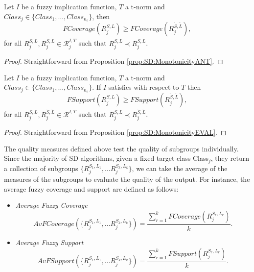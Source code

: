 \begin{proposition}\label{prop:SD:MonotonicityFCOV} 
	Let $I$ be a fuzzy implication function, $T$ a t-norm and $Class_j \in \{Class_1,\dots,Class_{n_c}\}$, then
	$$
	FCoverage(R^{S,L}_j) \geq FCoverage(R^{\tilde{S},\tilde{L}}_{j}),
	$$
	for all $R^{S,L}_j,R^{\tilde{S},\tilde{L}}_{j}  \in \mathcal{R}^{I,T}_j$ such that $R^{S,L}_j \prec R^{\tilde{S},\tilde{L}}_{j}$.
\end{proposition}

\begin{proof}
	Straightforward from Proposition \ref{prop:SD:MonotonicityANT}.
\end{proof}

\begin{proposition}\label{prop:MonotonicitySD}
	Let $I$ be a fuzzy implication function, $T$ a t-norm and $Class_j \in \{Class_1,\dots,Class_{n_c}\}$. If $I$ satisfies \MTC with respect to $T$ then
	$$FSupport(R^{S,L}_j) \geq FSupport(R^{\tilde{S},\tilde{L}}_{j}),$$
	 for all $R^{S,L}_j,R^{\tilde{S},\tilde{L}}_{j}  \in \mathcal{R}^{I,T}$ such that $R^{S,L}_j \prec R^{\tilde{S},\tilde{L}}_{j}$.
\end{proposition}

\begin{proof}
	Straightforward from Proposition \ref{prop:SD:MonotonicityEVAL}.
\end{proof}

The quality measures defined above test the quality of subgroups individually. Since the majority of SD algorithms, given a fixed target class Class$_j$, they return a collection of subgroups $\{R^{S_1,L_1}_{j},\dots R^{S_k,L_k}_{j}\}$, we can take the average of the measures of the subgroups to evaluate the quality of the output. For instance, the average fuzzy coverage and support are defined as follows:
\begin{itemize}
\item \textit{Average Fuzzy Coverage}
$$AvFCoverage(\{R^{S_1,L_1}_{j},\dots R^{S_k,L_k}_{j}\}) = \frac{\displaystyle \sum_{r=1}^k FCoverage(R^{S_r,L_r}_{j})}{k}.$$
\item \textit{Average Fuzzy Support}
$$AvFSupport(\{R^{S_1,L_1}_{j},\dots R^{S_k,L_k}_{j}\}) = \frac{\displaystyle \sum_{r=1}^k FSupport(R^{S_r,L_r}_{j})}{k}.$$
\end{itemize}

